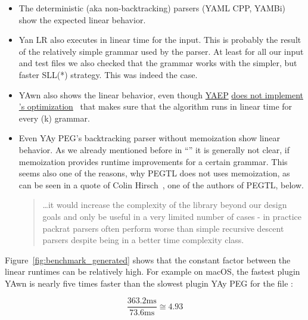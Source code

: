 \begin{itemize}
  \item The deterministic (aka non-backtracking) parsers (YAML CPP, YAMBi) show the expected linear behavior.

  \item Yan LR also executes in linear time for the input. This is probably the result of the relatively simple grammar used by the parser. At least for all our input and test files we also checked that the grammar works with the simpler, but faster \gls{SLL(*)} strategy. This was indeed the case.

  \item YAwn also shows the linear behavior, even though \href{https://github.com/vnmakarov/yaep}{\gls{YAEP}} \href{https://github.com/vnmakarov/yaep/issues/24}{does not implement \citeauthor{leo1991general}’s optimization}~\cite{leo1991general} that makes sure that the algorithm runs in linear time for every (k) grammar.

  \item Even YAy PEG’s backtracking parser without memoization show linear behavior. As we already mentioned before in “” it is generally not clear, if memoization provides runtime improvements for a certain grammar. This seems also one of the reasons, why \gls{PEGTL} does not uses memoization, as can be seen in a quote of Colin Hirsch~\cite{hirsch2016memo}, one of the authors of \gls{PEGTL}, below.

  \begin{quote}
     …it would increase the complexity of the library beyond our design goals and only be useful in a very limited number of cases - in practice packrat parsers often perform worse than simple recursive descent parsers despite being in a better time complexity class.
  \end{quote}

\end{itemize}

Figure~\ref{fig:benchmark_generated} shows that the constant factor between the linear runtimes can be relatively high. For example on macOS, the fastest plugin YAwn is nearly five times faster than the slowest plugin YAy PEG for the file \FileGenerated{}:

\begin{equation}
  \frac{363.2\text{ms}}{73.6\text{ms}} ≅ 4.93
  \label{eq:benchmark_difference}
\end{equation}

